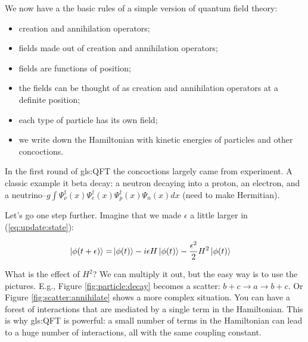 \documentclass[]{article}
\begin{document}
We now have a the basic rules of a simple version of quantum field theory:
\begin{itemize}
	\item creation and annihilation operators;
	\item fields made out of creation and annihilation operators;
	\item fields are functions of position;
	\item the fields can be thought of as creation and annihilation operators at a definite position;
	\item each type of particle has its own field;
	\item we write down the Hamiltonian with kinetic energies of particles and other concoctions. 
\end{itemize}

In the first round of \gls{gls:QFT} the concoctions largely came from experiment. A classic example it beta decay: a neutron decaying into a proton, an electron, and a neutrino--$g \int \Psi^\dagger_{\nu}(x) \Psi^\dagger_e(x) \Psi^\dagger_p(x) \Psi_n(x) dx$ (need to make Hermitian).

Let's go one step further. Imagine that we made $\epsilon$ a little larger in (\ref{eq:update:state}):

\begin{align*}
	\ket{\phi(t+\epsilon)} =& \ket{\phi(t)} -i \epsilon H \ket{\phi(t)} - \frac{\epsilon^2}{2} H^2 \ket{\phi(t)}
\end{align*}

What is the effect of $H^2$? We can multiply it out, but the easy way is to use the pictures. E.g., Figure \ref{fig:particle:decay} becomes a scatter: $b+c \rightarrow a \rightarrow b + c$. Or Figure \ref{fig:scatter:annihilate} shows a more complex situation. You can have a forest of interactions that are mediated by a single term in the Hamiltonian. This is why \glsdesc{gls:QFT} is powerful: a small number of terms in the Hamiltonian can lead to a huge number of interactions, all with the same coupling constant.
\end{document}
